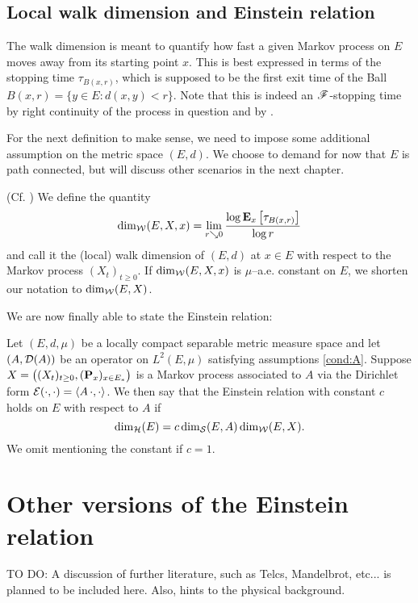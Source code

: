 \subsection{Local walk dimension and Einstein relation}

The walk dimension is meant to quantify how fast a given Markov process on $E$ moves away from its starting point $x$. This is best expressed in terms of the stopping time $\tau_{B(x,r)}$, which is supposed to be the first exit time of the Ball $B(x,r)=\{y\in E:d(x,y)<r\}$. Note that this is indeed an $\scF$-stopping time by right continuity of the process in question and by \cite[Lemma 7.6]{kallenberg2002foundations}.

For the next definition to make sense, we need to impose some additional assumption on the metric space $(E,d)$. We choose to demand for now that $E$ is path connected, but will discuss other scenarios in the next chapter. 
\begin{defin}\label{def:dimw}(Cf. \cite{hambly_kigami_kumagai_2002})
  We define the quantity
  \[
    \dimw(E,X,x)=\lim_{r\searrow0}\frac{\log \PTEp{\tau_{B(x,r)}}{x}}{\log r}
  \]
  and call it the (local) walk dimension of $(E,d)$ at $x\in E$ with respect to the Markov process $(X_t)_{t\geq0}$. If $\dimw(E,X,x)$ is $\mu$--a.e. constant on $E$, we shorten our notation to $\dimw(E,X)$.
\end{defin}
We are now finally able to state the Einstein relation: 
\begin{defin}
  Let $(E,d,\mu)$ be a locally compact separable metric measure space and let $(A,\cD(A))$ be an operator on $L^2(E,\mu)$ satisfying assumptions \ref{cond:A}. Suppose $X=\big((X_t)_{t\geq0},(\Prob_x)_{x\in E_*}\big)$ is a Markov process associated to $A$ via the Dirichlet form $\cE(\cdot,\cdot)=\left<A\,\cdot,\cdot\right>$. We then say that the Einstein relation with constant $c$ holds on $E$ with respect to $A$ if
  \begin{equation}\label{eq:ER}
    \dimh(E)=c\dims(E,A)\dimw(E,X).
  \end{equation}
  We omit mentioning the constant if $c=1$.
\end{defin}




\section{Other versions of the Einstein relation}

TO DO: A discussion of further literature, such as Telcs, Mandelbrot, etc... is planned to be included here. Also, hints to the physical background. 

